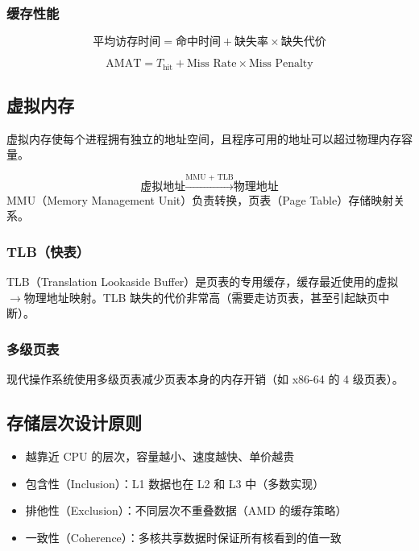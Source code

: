 \subsubsection{缓存性能}

\[
\text{平均访存时间} = \text{命中时间} + \text{缺失率} \times \text{缺失代价}
\]

\[
\text{AMAT} = T_{\text{hit}} + \text{Miss Rate} \times \text{Miss Penalty}
\]

\subsection{虚拟内存}

虚拟内存使每个进程拥有独立的地址空间，且程序可用的地址可以超过物理内存容量。

\begin{definition}[虚拟地址与物理地址]
\[
\text{虚拟地址} \xrightarrow{\text{MMU + TLB}} \text{物理地址}
\]
MMU（Memory Management Unit）负责转换，页表（Page Table）存储映射关系。
\end{definition}

\subsubsection{TLB（快表）}

TLB（Translation Lookaside Buffer）是页表的专用缓存，缓存最近使用的虚拟$\to$物理地址映射。TLB 缺失的代价非常高（需要走访页表，甚至引起缺页中断）。

\subsubsection{多级页表}

现代操作系统使用多级页表减少页表本身的内存开销（如 x86-64 的 4 级页表）。

\subsection{存储层次设计原则}

\begin{itemize}
    \item 越靠近 CPU 的层次，容量越小、速度越快、单价越贵
    \item 包含性（Inclusion）：L1 数据也在 L2 和 L3 中（多数实现）
    \item 排他性（Exclusion）：不同层次不重叠数据（AMD 的缓存策略）
    \item 一致性（Coherence）：多核共享数据时保证所有核看到的值一致
\end{itemize}
